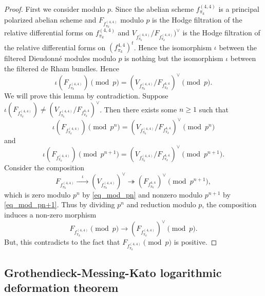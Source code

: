 \documentclass[12pt,twoside]{book}
\theoremstyle{plain}
\theoremstyle{definition}
\theoremstyle{remark}
\numberwithin{equation}{section}
\begin{document}
\begin{proof}
First we consider modulo $p$. Since the abelian scheme $f^{(4,4)}_{\pi_k}$ is a principal polarized abelian scheme
and $ F_{f^{(4,4)}_{\pi_k}}$ modulo $p$ is the Hodge filtration of the relative differential forms on $f^{(4,4)}_{\pi_k}$ and
$V_{f^{(4,4)}_{\pi_k}}/F_{f^{(4,4)}_{\pi_k}})^\vee$ is the Hodge filtration of the relative differential forms on $(f^{4,4}_{\pi_k})^t$.
Hence the isomorphism $\iota$ between the filtered Dieudonn\'e modules modulo $p$ is nothing but the isomorphism $\iota$ between the filtered de Rham bundles. Hence
\[\iota\left(F_{f^{(4,4)}_{\pi_k}}\right) \pmod{p} = (V_{f^{(4,4)}_{\pi_k}}/F_{f^{4,4}_{\pi_k}})^\vee\pmod{p}.\]
We will prove this lemma by contradiction. Suppose $\iota(F_{f^{(4,4)}_{\pi_k}})\neq (V_{f^{(4,4)}_{\pi_k}}/F_{f^{4,4}_{\pi_k}})^\vee$. Then there exists some $n\geq1$ such that
\begin{equation} \label{eq_mod_pn}
\iota\left(F_{f^{(4,4)}_{\pi_k}}\right) \pmod{p^n} = (V_{f^{(4,4)}_{\pi_k}}/F_{f^{4,4}_{\pi_k}})^\vee\pmod{p^n}
\end{equation}
and
\begin{equation} \label{eq_mod_pn+1}
\iota\left(F_{f^{(4,4)}_{\pi_k}}\right) \pmod{p^{n+1}} = (V_{f^{(4,4)}_{\pi_k}}/F_{f^{4,4}_{\pi_k}})^\vee\pmod{p^{n+1}}.
\end{equation}
Consider the composition
\[F_{f^{(4,4)}_{\pi_k}} \xrightarrow{\quad \iota \quad} (V_{f^{(4,4)}_{\pi_k}})^\vee \twoheadrightarrow (F_{f^{4,4}_{\pi_k}})^\vee\pmod{p^{n+1}},\]
which is zero modulo $p^n$ by \eqref{eq_mod_pn} and nonzero modulo $p^{n+1}$ by \eqref{eq_mod_pn+1}. Thus by dividing $p^n$ and reduction modulo $p$, the composition induces a non-zero morphism
\[F_{f^{(4,4)}_{\pi_k}} \pmod{p} \rightarrow (F_{f^{(4,4)}_{\pi_k}})^\vee \pmod{p}.\]
But, this contradicts to the fact that $F_{f^{(4,4)}_{\pi_k}} \pmod{p}$ is positive.
\end{proof}

\subsection{Grothendieck-Messing-Kato logarithmic deformation theorem}
\end{document}
